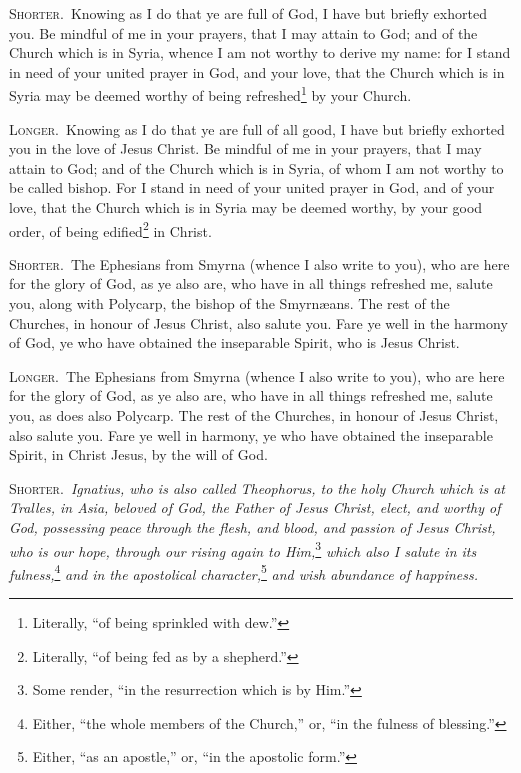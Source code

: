 
\textsc{Shorter.}~Knowing as I do that ye are full of God, I have but briefly exhorted you. Be mindful of me in your prayers, that I may attain to God; and of the Church which is in Syria, whence I am not worthy to derive my name: for I stand in need of your united prayer in God, and your love, that the Church which is in Syria may be deemed worthy of being refreshed\footnote{Literally, “of being sprinkled with dew.”} by your Church.

\textsc{Longer.}~Knowing as I do that ye are full of all good, I have but briefly exhorted you in the love of Jesus Christ. Be mindful of me in your prayers, that I may attain to God; and of the Church which is in Syria, of whom I am not worthy to be called bishop. For I stand in need of your united prayer in God, and of your love, that the Church which is in Syria may be deemed worthy, by your good order, of being edified\footnote{Literally, “of being fed as by a shepherd.”} in Christ.


\textsc{Shorter.}~The Ephesians from Smyrna (whence I also write to you), who are here for the glory of God, as ye also are, who have in all things refreshed me, salute you, along with Polycarp, the bishop of the Smyrnæans. The rest of the Churches, in honour of Jesus Christ, also salute you. Fare ye well in the harmony of God, ye who have obtained the inseparable Spirit, who is Jesus Christ.

\textsc{Longer.}~The Ephesians from Smyrna (whence I also write to you), who are here for the glory of God, as ye also are, who have in all things refreshed me, salute you, as does also Polycarp. The rest of the Churches, in honour of Jesus Christ, also salute you. Fare ye well in harmony, ye who have obtained the inseparable Spirit, in Christ Jesus, by the will of God.


\textsc{Shorter.}~\emph{Ignatius, who is also called Theophorus, to the holy Church which is at Tralles, in Asia, beloved of God, the Father of Jesus Christ, elect, and worthy of God, possessing peace through the flesh, and blood, and passion of Jesus Christ, who is our hope, through our rising again to Him,}\footnote{Some render, “in the resurrection which is by Him.”}\emph{ which also I salute in its fulness,}\footnote{Either, “the whole members of the Church,” or, “in the fulness of blessing.”}\emph{ and in the apostolical character,}\footnote{Either, “as an apostle,” or, “in the apostolic form.”}\emph{ and wish abundance of happiness.}

